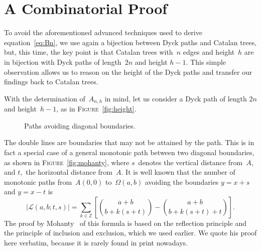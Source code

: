 \documentclass[11pt]{article}
\newcommand\fig{\textsc{Figure}}
\begin{document}
\section*{A Combinatorial Proof}

To avoid the aforementioned advanced techniques used to derive
equation~\eqref{eq:Bn}, we use again a bijection between Dyck paths
and Catalan trees, but, this time, the key point is that Catalan trees
with~\(n\) edges and height~\(h\) are in bijection with Dyck paths of
length~\(2n\) and height \(h-1\). This simple observation allows us to
reason on the height of the Dyck paths and transfer our findings back
to Catalan trees.

With the determination of~\(A_{n,h}\) in mind, let us consider a Dyck
path of length \(2n\) and height~\(h-1\), as in \fig~\ref{fig:height}.
\begin{figure}[!b]
\centering
{}
\qquad
{}
\caption{Paths avoiding diagonal boundaries.\label{fig:boundaries}}
\end{figure}
The double lines are boundaries that may not be attained by the
path. This is in fact a special case of a general monotonic path
between two diagonal boundaries, as shown in \fig~\ref{fig:mohanty},
where \(s\)~denotes the vertical distance from~\(A\), and \(t\),~the
horizontal distance from~\(A\). It is well known that the number of
monotonic paths from~\(A(0,0)\) to~\(\Omega(a,b)\) avoiding the
boundaries \(y = x + s\) and \(y = x - t\) is
\begin{equation}
\left\lvert\mathcal{L}(a,b;t,s)\right\rvert = \sum_{k \in \mathbb{Z}}\left[\binom{a+b}{b+k(s+t)} - \binom{a+b}{b+k(s+t)+t}\right].
\label{eq:mohanty}
\end{equation}
The proof by Mohanty~\cite[p.~6]{Mohanty:1979} of this formula is
based on the reflection principle and the principle of inclusion and
exclusion, which we used earlier. We quote his proof here verbatim,
because it is rarely found in print nowadays.
\end{document}
